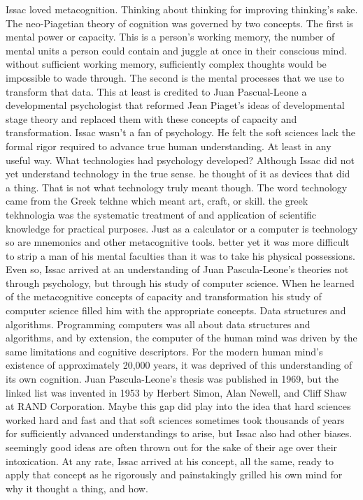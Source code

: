 \documentclass[a4paper,twoside,fontsize=12pt,pagesize=auto]{scrbook}
\begin{document}
Issac loved metacognition. Thinking about thinking for improving thinking's sake. The neo\hyp{}Piagetian theory of cognition was governed by two concepts. The first is mental power or capacity. This is a person's working memory, the number of mental units a person could contain and juggle at once in their conscious mind. without sufficient working memory, sufficiently complex thoughts would be impossible to wade through. The second is the mental processes that we use to transform that data. This at least is credited to Juan Pascual\hyp{}Leone a developmental psychologist that reformed Jean Piaget's ideas of developmental stage theory and replaced them with these concepts of capacity and transformation. Issac wasn't a fan of psychology. He felt the soft sciences lack the formal rigor required to advance true human understanding. At least in any useful way. What technologies had psychology developed? Although Issac did not yet understand technology in the true sense. he thought of it as devices that did a thing. That is not what technology truly meant though. The word technology came from the Greek tekhne which meant art, craft, or skill. the greek tekhnologia was the systematic treatment of and application of scientific knowledge for practical purposes. Just as a calculator or a computer is technology so are mnemonics and other metacognitive tools. better yet it was more difficult to strip a man of his mental faculties than it was to take his physical possessions. Even so, Issac arrived at an understanding of Juan Pascula\hyp{}Leone's theories not through psychology, but through his study of computer science. When he learned of the metacognitive concepts of capacity and transformation his study of computer science filled him with the appropriate concepts. Data structures and algorithms. Programming computers was all about data structures and algorithms, and by extension, the computer of the human mind was driven by the same limitations and cognitive descriptors.
For the modern human mind's existence of approximately 20,000 years, it was deprived of this understanding of its own cognition. Juan Pascula\hyp{}Leone's thesis was published in 1969, but the linked list was invented in 1953 by Herbert Simon, Alan Newell, and Cliff Shaw at RAND Corporation. Maybe this gap did play into the idea that hard sciences worked hard and fast and that soft sciences sometimes took thousands of years for sufficiently advanced understandings to arise, but Issac also had other biases. seemingly good ideas are often thrown out for the sake of their age over their intoxication. At any rate, Issac arrived at his concept, all the same, ready to apply that concept as he rigorously and painstakingly grilled his own mind for why it thought a thing, and how.
\end{document}
